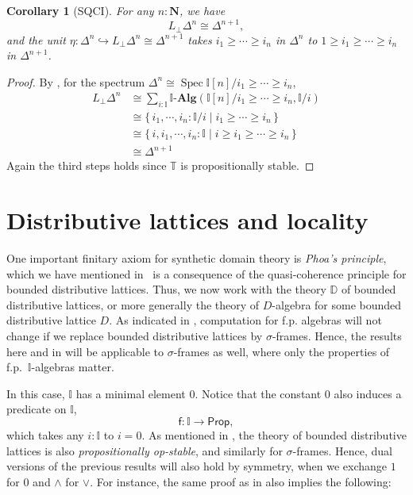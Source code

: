 \documentclass[12pt]{amsart}
\newtheorem{corollary}[theorem]{Corollary}
\theoremstyle{definition}
\newcommand{\mb}[1]{\mathbf{#1}}
\newcommand{\mbb}[1]{\mathbb{#1}}
\newcommand{\T}{\mbb T}
\newcommand{\I}{\mbb I}
\newcommand{\ms}[1]{\mathsf{#1}}
\newcommand{\alg}{\text{-}\mb{Alg}}
\newcommand{\scomp}[2]{\{\,#1\mid#2\,\}}
\newcommand{\hook}{\hookrightarrow}
\newcommand{\N}{\mb N}
\newcommand{\prt}{_{\bot}}
\newcommand{\pp}{\ms{Prop}}
\newcommand{\spec}{\operatorname{Spec}}
\begin{document}

\begin{corollary}[SQCI]
  For any $n : \N$, we have
  \[ L\prt\Delta^n \cong \Delta^{n+1}, \]
  and the unit $\eta \colon \Delta^n \hook L\prt\Delta^n \cong \Delta^{n+1}$ takes $i_1 \ge \cdots \ge i_n$ in $\Delta^n$ to $1 \ge i_1 \ge \cdots \ge i_n$ in $\Delta^{n+1}$. 
\end{corollary}
\begin{proof}
  By , for the spectrum $\Delta^n \cong \spec\I[n]/i_1 \ge \cdots \ge i_n$,
  \begin{align*}
    L\prt\Delta^n
    &\cong \sum_{i:\I}\I\alg(\I[n]/i_1\ge\cdots\ge i_n,\I/i) \\
    &\cong \scomp{i_1,\cdots,i_n:\I/i}{i_1 \ge \cdots \ge i_n} \\
    &\cong \scomp{i,i_1,\cdots,i_n:\I}{i \ge i_1 \ge \cdots \ge i_n} \\
    &\cong \Delta^{n+1}
  \end{align*}
  Again the third steps holds since $\T$ is propositionally stable.
\end{proof}

\section{Distributive lattices and locality}\label{sec:locality}

One important finitary axiom for synthetic domain theory is \emph{Phoa's principle}, which we have mentioned in~ is a consequence of the quasi-coherence principle for bounded distributive lattices. 
Thus, we now work with the theory $\mbb D$ of bounded distributive lattices, or more generally the theory of $D$-algebra for some bounded distributive lattice $D$. As indicated in , computation for f.p. algebras 
will not change if we replace bounded distributive lattices by $\sigma$-frames. Hence, the results here and in  will be applicable to $\sigma$-frames as well, where only the properties of f.p.\ $\I$-algebras matter.

In this case, $\I$ has a minimal element $0$. Notice that the constant $0$ also induces a predicate on $\I$,
\[ \ms f \colon \I \to \pp, \]
which takes any $i : \I$ to $i = 0$. As mentioned in , the theory of bounded distributive lattices is also \emph{propositionally op-stable}, and similarly for $\sigma$-frames. 
Hence, dual versions of the previous results will also hold by symmetry, when we exchange $1$ for $0$ and $\wedge$ for $\vee$. For instance, the same proof as in  also implies the following:
\end{document}
